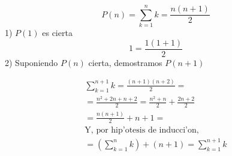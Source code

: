 \documentclass[12pt]{article}
\begin{document}
$$
P(n) = \sum_{k=1}^nk = \frac{n(n+1)}{2} 
$$
1) $P(1)$ es cierta
$$
     1 = \frac{1(1+1)}{2}
$$
2) Suponiendo $P(n)$ cierta, demostramos $P(n+1)$

\begin{align*}
	\sum_{k=1}^{n+1}k = \frac{(n+1)(n+2)}{2} = \\
	=\frac{n^2+2n+n+2}{2} = \frac{n^2+n}{2} + \frac{2n+2}{2} \\
	= \frac{n(n+1)}{2} + n+1 = \\
	 \text{Y, por hip'otesis de inducci'on,} \\
	 = \left(\sum_{k=1}^nk\right)+(n+1) =
	  \sum_{k=1}^{n+1}k
\end{align*}
\end{document}
